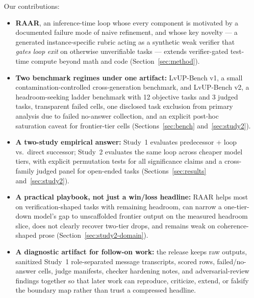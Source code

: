 \documentclass[journal]{IEEEtran}
\newcommand{\method}{RAAR}
\newcommand{\bench}{LvUP-Bench}
\begin{document}
Our contributions:
\begin{itemize}
\item \textbf{\method{}}, an inference-time loop whose every component is
motivated by a documented failure mode of naive refinement, and whose key
novelty --- a generated instance-specific rubric acting as a synthetic weak
verifier that \emph{gates loop exit} on otherwise unverifiable tasks ---
extends verifier-gated test-time compute beyond math and code
(Section~\ref{sec:method}).
\item \textbf{Two benchmark regimes under one artifact:} \bench{} v1, a
small contamination-controlled cross-generation benchmark, and
\bench{} v2, a headroom-seeking ladder benchmark with 12 objective
tasks and 3 judged tasks, transparent failed cells, one disclosed
task exclusion from primary analysis due to failed no-answer collection,
and an explicit post-hoc saturation caveat for frontier-tier
cells (Sections~\ref{sec:bench} and~\ref{sec:study2}).
\item \textbf{A two-study empirical answer:} Study~1 evaluates
predecessor + loop vs.\ direct successor; Study~2 evaluates the same loop
across cheaper model tiers, with explicit permutation tests for all
significance claims and a cross-family judged panel for open-ended tasks
(Sections~\ref{sec:results} and~\ref{sec:study2}).
\item \textbf{A practical playbook, not just a win/loss headline:}
\method{} helps most on verification-shaped tasks with remaining headroom,
can narrow a one-tier-down model's gap to unscaffolded frontier output on the
measured headroom slice, does not clearly recover two-tier drops, and remains weak on
coherence-shaped prose (Section~\ref{sec:study2-domain}).
\item \textbf{A diagnostic artifact for follow-on work:} the release keeps raw
outputs, sanitized Study~1 role-separated message transcripts, scored rows,
failed/no-answer cells, judge manifests, checker hardening notes, and
adversarial-review findings together so that later work can reproduce,
criticize, extend, or falsify the boundary map rather than trust a compressed
headline.
\end{itemize}
\end{document}
